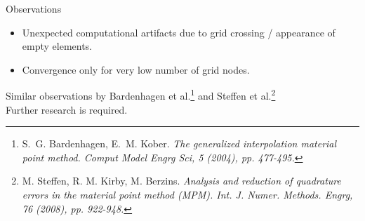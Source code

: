 \documentclass{beamer}
\begin{document}
\begin{frame}{Observations}
\begin{itemize}
\item Unexpected computational artifacts due to grid crossing / appearance of empty elements.
\item Convergence only for very low number of grid nodes.
\end{itemize}


Similar observations by Bardenhagen et al.\footnote{S.~G. Bardenhagen, E.~M. Kober. \em{The generalized interpolation material point method}. Comput Model Engrg Sci, 5 (2004), pp. 477-495.} and Steffen et al.\footnote{M. Steffen, R. M. Kirby, M. Berzins. \em{Analysis and reduction of quadrature errors in the material point method (MPM)}. Int. J. Numer. Methods. Engrg, 76 (2008), pp. 922-948.}\\
Further research is required.
\end{frame}
\end{document}

